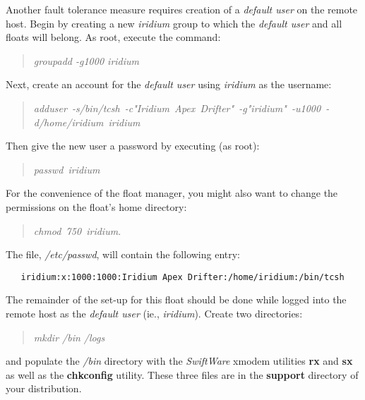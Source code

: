 Another fault tolerance measure requires creation of a \emph{default user}
on the remote host.  Begin by creating a new {\sl iridium}\/ group to which
the \emph{default user} and all floats will belong.  As root, execute the
command: 
\begin{quotation}
  {\sl groupadd -g1000 iridium}
\end{quotation}

Next, create an account for the \emph{default user}\/ using \emph{iridium}\/
as the username:
\begin{quotation}
  \mbox{\sl adduser~-s/bin/tcsh~-c"Iridium~Apex~Drifter"~-g"iridium"~-u1000~-d/home/iridium~iridium}
\end{quotation}
Then give the new user a password by executing (as root): 
\begin{quotation}
   {\sl passwd~iridium}
\end{quotation}
For the convenience of the float manager, you might also want to change the
permissions on the float's home directory: 
\begin{quotation}
   {\sl chmod~750~\-iridium}.
\end{quotation}
The file, {\sl /etc/passwd\/}, will contain the following entry:
\begin{verbatim}
   iridium:x:1000:1000:Iridium Apex Drifter:/home/iridium:/bin/tcsh
\end{verbatim}

The remainder of the set-up for this float should be done while logged into
the remote host as the \emph{default user}\/ (ie., \emph{iridium}\/).
Create two directories:
\begin{quotation}
   {\sl mkdir \-/bin \-/logs} 
\end{quotation}
and populate the {\sl \-/bin\/} directory with the \emph{SwiftWare}\/ xmodem
utilities \textbf{rx} and \textbf{sx} as well as the \textbf{chkconfig}
utility.  These three files are in the \textbf{support} directory of your
distribution.

